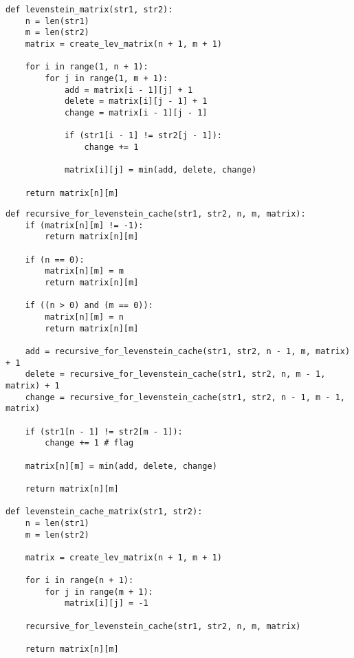 \begin{center}
    \captionsetup{justification=raggedright,singlelinecheck=off}
    \begin{lstlisting}[label=lst:lev_mat,caption=Алгоритм нахождения расстояния Левенштейна (матричный)]
def levenstein_matrix(str1, str2):
    n = len(str1)
    m = len(str2)
    matrix = create_lev_matrix(n + 1, m + 1)

    for i in range(1, n + 1):
        for j in range(1, m + 1):
            add = matrix[i - 1][j] + 1
            delete = matrix[i][j - 1] + 1
            change = matrix[i - 1][j - 1]
            
            if (str1[i - 1] != str2[j - 1]):
                change += 1

            matrix[i][j] = min(add, delete, change)

    return matrix[n][m]
\end{lstlisting}
\end{center}


\begin{center}
    \captionsetup{justification=raggedright,singlelinecheck=off}
    \begin{lstlisting}[label=lst:lev_cach,caption=Алгоритм нахождения расстояния Левенштейна c использованием кеша в виде матрицы]
def recursive_for_levenstein_cache(str1, str2, n, m, matrix):
    if (matrix[n][m] != -1):
        return matrix[n][m]

    if (n == 0):
        matrix[n][m] = m
        return matrix[n][m]

    if ((n > 0) and (m == 0)):
        matrix[n][m] = n
        return matrix[n][m]

    add = recursive_for_levenstein_cache(str1, str2, n - 1, m, matrix) + 1
    delete = recursive_for_levenstein_cache(str1, str2, n, m - 1, matrix) + 1
    change = recursive_for_levenstein_cache(str1, str2, n - 1, m - 1, matrix)

    if (str1[n - 1] != str2[m - 1]):
        change += 1 # flag

    matrix[n][m] = min(add, delete, change)

    return matrix[n][m]

def levenstein_cache_matrix(str1, str2):
    n = len(str1)
    m = len(str2)

    matrix = create_lev_matrix(n + 1, m + 1)

    for i in range(n + 1):
        for j in range(m + 1):
            matrix[i][j] = -1

    recursive_for_levenstein_cache(str1, str2, n, m, matrix)

    return matrix[n][m]
\end{lstlisting}
\end{center}


